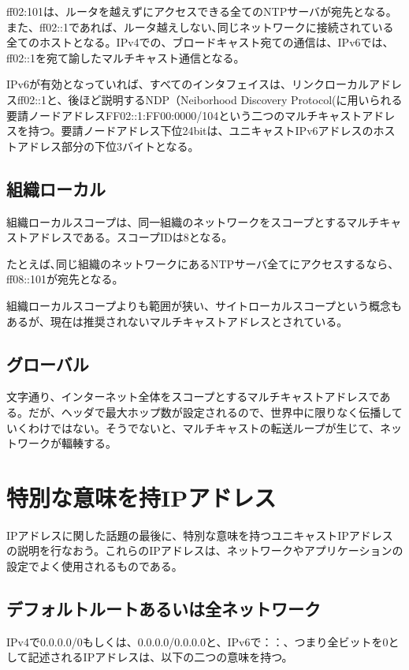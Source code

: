 ff02:101は、ルータを越えずにアクセスできる全てのNTPサーバが宛先となる。
また、ff02::1であれば、ルータ越えしない､同じネットワークに接続されている全てのホストとなる。IPv4での、ブロードキャスト宛ての通信は、IPv6では、ff02::1を宛て諭したマルチキャスト通信となる。

IPv6が有効となっていれば、すべてのインタフェイスは、リンクローカルアドレスff02::1と、後ほど説明するNDP（Neiborhood Discovery Protocol(に用いられる要請ノードアドレスFF02::1:FF00:0000/104という二つのマルチキャストアドレスを持つ。要請ノードアドレス下位24bitは、ユニキャストIPv6アドレスのホストアドレス部分の下位3バイトとなる。


\subsection{組織ローカル}
組織ローカルスコープは、同一組織のネットワークをスコープとするマルチキャストアドレスである。スコープIDは8となる。

たとえば､同じ組織のネットワークにあるNTPサーバ全てにアクセスするなら、ff08::101が宛先となる。

組織ローカルスコープよりも範囲が狭い、サイトローカルスコープという概念もあるが、現在は推奨されないマルチキャストアドレスとされている。

\subsection{グローバル}
文字通り、インターネット全体をスコープとするマルチキャストアドレスである。だが、ヘッダで最大ホップ数が設定されるので、世界中に限りなく伝播していくわけではない。そうでないと、マルチキャストの転送ループが生じて、ネットワークが輻輳する。


\section{特別な意味を持IPアドレス}

IPアドレスに関した話題の最後に、特別な意味を持つユニキャストIPアドレスの説明を行なおう。これらのIPアドレスは、ネットワークやアプリケーションの設定でよく使用されるものである。

\subsection{デフォルトルートあるいは全ネットワーク}

IPv4で0.0.0.0/0もしくは、0.0.0.0/0.0.0.0と、IPv6で：：、つまり全ビットを0として記述されるIPアドレスは、以下の二つの意味を持つ。

